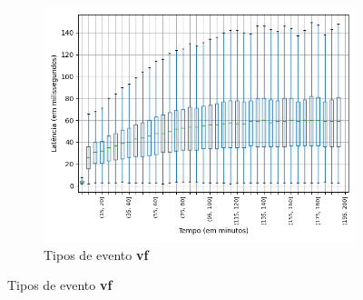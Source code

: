 \begin{figure}
\centering
\begin{subfigure}{.5\textwidth}
\centering
\includegraphics[width=\textwidth]{figuras/graphics/boxplot_9-dez-su_vf.png}
\caption{Tipos de evento \textbf{vf}}
\label{fig:BoxPlot_vf_SU_9-dez-su}
\end{subfigure}%


\end{figure}
